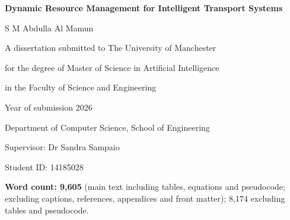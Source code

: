 \documentclass[12pt,a4paper]{article}
\begin{document}
\thispagestyle{empty}
\begin{center}
\vspace*{12mm}
\parbox{0.72\textwidth}{\centering\Large\bfseries Dynamic Resource Management for Intelligent Transport Systems\par}\par
\vspace{18mm}
{\large S M Abdulla Al Mamun\par}
\vspace{12mm}
A dissertation submitted to The University of Manchester\par
for the degree of Master of Science in Artificial Intelligence\par
in the Faculty of Science and Engineering\par
\vspace{8mm}
Year of submission 2026\par
\vspace{8mm}
Department of Computer Science, School of Engineering\par
\vspace{8mm}
Supervisor: Dr Sandra Sampaio\par
\end{center}
\vfill
\noindent Student ID: 14185028\par
\clearpage
\tableofcontents
\vfill\noindent\textbf{Word count: 9,605} (main text including tables, equations
and pseudocode; excluding captions, references, appendices and front matter);
8,174 excluding tables and pseudocode.\par
\clearpage
{\small\singlespacing
\listoffigures
\listoftables
}
\clearpage
\end{document}
